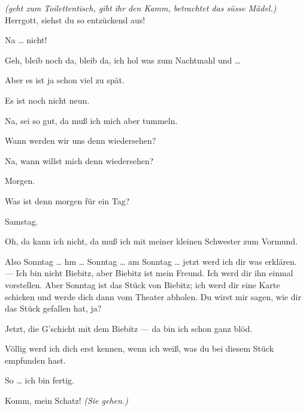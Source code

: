 \documentclass[
	final,
	a4paper,
	ngerman,
	mpinclude = true, %
	twoside = true,
	open = right,
	cleardoublepage = plain,
	DIV = 13,
	BCOR = 1cm,
	titlepage = firstiscover,
	]{scrbook}
\newcommand{\direction}[1]{\textit{(#1)}}
\newcommand{\thecharacter}[1]{\textup{\textsc{#1}}\xspace}
\newcommand{\thesuesse}{\thecharacter{Süßes Mädel}}
\newcommand{\thedichter}{\thecharacter{Dichter}}
\newcommand{\character}[1]{\item[#1:]}
\newcommand{\suesse}{\character{\thesuesse}}
\newcommand{\dichter}{\character{\thedichter}}
\begin{document}
\begin{play}
	\dichter
	\direction{geht zum Toilettentisch, gibt ihr den Kamm, betrachtet das süsse Mädel.} Herrgott, siehst du so entzückend aus!

	\suesse
	Na \ldots{} nicht!

	\dichter
	Geh, bleib noch da, bleib da, ich hol was zum Nachtmahl und \ldots{}

	\suesse
	Aber es ist ja schon viel zu spät.

	\dichter
	Es ist noch nicht neun.

	\suesse
	Na, sei so gut, da muß ich mich aber tummeln.

	\dichter
	Wann werden wir uns denn wiedersehen?

	\suesse
	Na, wann willst mich denn wiedersehen?

	\dichter
	Morgen.

	\suesse
	Was ist denn morgen für ein Tag?

	\dichter
	Samstag.

	\suesse
	Oh, da kann ich nicht, da muß ich mit meiner kleinen Schwester zum Vormund.

	\dichter
	Also Sonntag \ldots{} hm \ldots{} Sonntag \ldots{} am Sonntag \ldots{} jetzt werd ich dir was erklären. --- Ich bin nicht Biebitz, aber Biebitz ist mein Freund. Ich werd dir ihn einmal vorstellen. Aber Sonntag ist das Stück von Biebitz; ich werd dir eine Karte schicken und werde dich dann vom Theater abholen. Du wirst mir sagen, wie dir das Stück gefallen hat, ja?

	\suesse
	Jetzt, die G'schicht mit dem Biebitz --- da bin ich schon ganz blöd.

	\dichter
	Völlig werd ich dich erst kennen, wenn ich weiß, was du bei diesem Stück empfunden hast.

	\suesse
	So \ldots{} ich bin fertig.

	\dichter
	Komm, mein Schatz! \direction{Sie gehen.}

\end{play}
\end{document}
